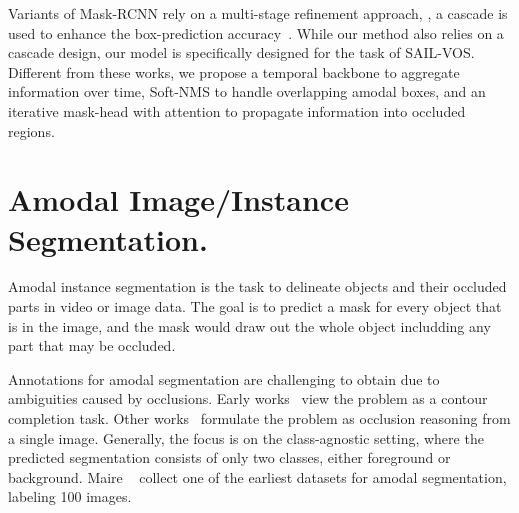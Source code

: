 Variants of Mask-RCNN rely on a multi-stage refinement approach, \ie, a cascade is used to enhance the box-prediction accuracy~\cite{cai2018cascade, chen2019hybrid}. While our method also relies on a cascade design, our model is specifically designed for the task of SAIL-VOS. Different from these works, we propose a temporal backbone to aggregate information over time, Soft-NMS to handle overlapping amodal boxes, and an iterative mask-head with attention to propagate information into occluded regions. 

\section{Amodal Image/Instance Segmentation.}
Amodal instance segmentation is the task to delineate objects and their occluded parts in video or image data. The goal is to predict a mask for every object that is in the image, and the mask would draw out the whole object includding any part that may be occluded. 

Annotations for amodal segmentation are challenging to obtain due to  ambiguities caused by  occlusions. Early works~\cite{GuoECCV2012, GuptaCVPR2013, SilbermanECCV2014b, KarICCV2015} view the problem as a contour completion task. Other works~\cite{HsiaoCVPR2012, PepikCVPR2013, GhiasiCVPR2014, ChenCVPR2015, LiECCV2016}  formulate the problem as occlusion reasoning from a single image. Generally, the focus is on the class-agnostic setting, where the predicted segmentation consists of only two classes, either foreground or background. Maire \etal~\cite{maire2013hierarchical} collect one of the earliest datasets for amodal segmentation, labeling 100 images. %


